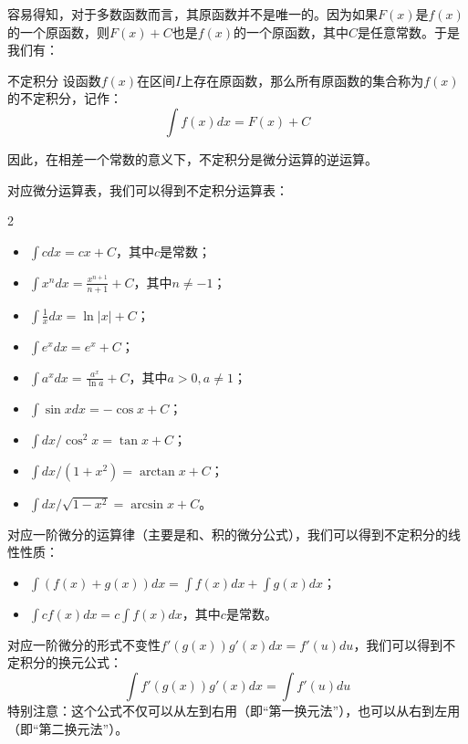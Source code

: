 容易得知，对于多数函数而言，其原函数并不是唯一的。因为如果$F(x)$是$f(x)$的一个原函数，则$F(x) + C$也是$f(x)$的一个原函数，其中$C$是任意常数。于是我们有：
\begin{definition}{不定积分}{}
    设函数$f(x)$在区间$I$上存在原函数，那么所有原函数的集合称为$f(x)$的不定积分，记作：
    \begin{equation}
        \int f(x) dx = F(x) + C
    \end{equation}
\end{definition}
因此，在相差一个常数的意义下，不定积分是微分运算的逆运算。

对应微分运算表，我们可以得到不定积分运算表：
\begin{multicols}{2}
    \begin{itemize}
        \item $\int c dx = cx + C$，其中$c$是常数；
        \item $\int x^n dx = \frac{x^{n+1}}{n+1} + C$，其中$n \neq -1$；
        \item $\int \frac{1}{x} dx = \ln |x| + C$；
        \item $\int e^x dx = e^x + C$；
        \item $\int a^x dx = \frac{a^x}{\ln a} + C$，其中$a > 0, a \neq 1$；
        \item $\int \sin x dx = -\cos x + C$；
        \item $\int dx/\cos^2 x = \tan x + C$；
        \item $\int dx/(1 + x^2) = \arctan x + C$；
        \item $\int dx/\sqrt{1 - x^2} = \arcsin x + C$。
    \end{itemize}
\end{multicols}

对应一阶微分的运算律（主要是和、积的微分公式），我们可以得到不定积分的线性性质：
\begin{itemize}
    \item $\int (f(x) + g(x)) dx = \int f(x) dx + \int g(x) dx$；
    \item $\int c f(x) dx = c \int f(x) dx$，其中$c$是常数。
\end{itemize}

对应一阶微分的形式不变性$f'(g(x)) g'(x) dx = f'(u) du$，我们可以得到不定积分的换元公式：
\begin{equation}
    \int f'(g(x)) g'(x) dx = \int f'(u) du
\end{equation}
特别注意：这个公式不仅可以从左到右用（即“第一换元法”），也可以从右到左用（即“第二换元法”）。

